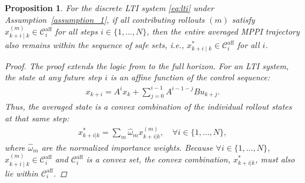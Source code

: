 \documentclass[letterpaper, 10 pt, conference]{ieeeconf}
\newtheorem{proposition}{Proposition}
\begin{document}
\begin{proposition} \label{prop:2}
For the discrete LTI system \eqref{eq:lti} under Assumption~\ref{assumption_1}, if all contributing rollouts $(m)$ satisfy $x^{(m)}_{k+i\mid k} \in \mathcal{C}_i^{\mathrm{aff}}$ for all steps $i \in \{1, \dots, N\}$, then the entire averaged MPPI trajectory also remains within the sequence of safe sets, \textit{i.e.,} $x^*_{k+i\mid k} \in \mathcal{C}_i^{\mathrm{aff}}$ for all $i$.

\begin{proof}
    The proof extends the logic from  to the full horizon. For an LTI system, the state at any future step $i$ is an affine function of the control sequence:
    \begin{align*}
        x_{k+i}=A^{i}x_k + \sum^{i-1}_{j=0}A^{i-1-j}Bu_{k+j}.
    \end{align*}
    Thus, the averaged state is a convex combination of the individual rollout states at that same step:
    \begin{align}
    x^*_{k+i|k} = \sum_m \hat{\omega}_m x^{(m)}_{k+i|k}, \quad \forall i \in \{1, \dots, N\}, \nonumber
    \end{align}
    where $\hat{\omega}_m$ are the normalized importance weights. Because $\forall i \in \{1, \dots, N\}$, $x^{(m)}_{k+i\mid k}\in\mathcal{C}_i^{\mathrm{aff}}$ and $\mathcal{C}_i^{\mathrm{aff}}$ is a convex set, the convex combination, $x^*_{k+i|k}$, must also lie within $\mathcal{C}_i^{\mathrm{aff}}$. 
\end{proof}
\end{proposition}
%
%
\end{document}
